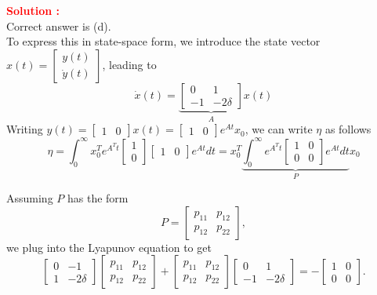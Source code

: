 \documentclass[12pt]{article}
\begin{document}
\textbf{\textcolor{red}{Solution :}} \\
Correct answer is (d).\\
To express this in state-space form, we introduce the state vector $x(t) = \begin{bmatrix} y(t) \\ \dot{y}(t) \end{bmatrix}$, leading to
\begin{equation}
    \dot{x}(t) = \underbrace{\begin{bmatrix} 0 & 1 \\ -1 & -2\delta \end{bmatrix}}_{A} x(t) 
\end{equation}
Writing \(y(t) = \begin{bmatrix}
    1 & 0
\end{bmatrix} x(t) = \begin{bmatrix}
    1 & 0

\end{bmatrix} e^{At} x_0 \), we can write \(\eta\) as follows
\begin{equation}
    \eta = \int_0^{\infty} x_0^T e^{A^Tt} \begin{bmatrix}
        1 \\ 0
    \end{bmatrix} \begin{bmatrix}
        1 & 0
    \end{bmatrix} e^{At} dt = x_0^T \underbrace{\int_0^{\infty} e^{A^Tt} \begin{bmatrix}
        1 & 0 \\ 0 & 0
    \end{bmatrix} e^{At} dt}_{P} x_0
\end{equation}

Assuming $P$ has the form
\[
P = \begin{bmatrix} p_{11} & p_{12} \\ p_{12} & p_{22} \end{bmatrix},
\]
we plug into the Lyapunov equation to get
\[
\begin{bmatrix} 0 & -1 \\ 1 & -2\delta \end{bmatrix} \begin{bmatrix} p_{11} & p_{12} \\ p_{12} & p_{22} \end{bmatrix} + \begin{bmatrix} p_{11} & p_{12} \\ p_{12} & p_{22} \end{bmatrix} \begin{bmatrix} 0 & 1 \\ -1 & -2\delta \end{bmatrix} = -\begin{bmatrix} 1 & 0 \\ 0 & 0 \end{bmatrix}.
\]
\end{document}
